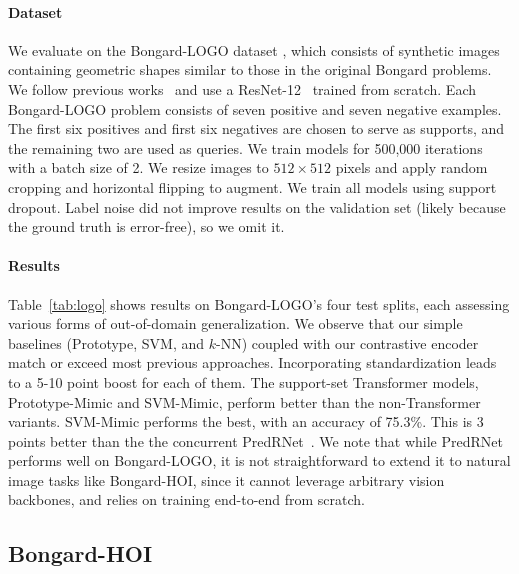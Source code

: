 \paragraph{Dataset}
We evaluate on the Bongard-LOGO dataset \cite{nie2021bongardlogo}, which consists of synthetic images containing geometric shapes similar to those in the original Bongard problems.
We follow previous works~\cite{nie2021bongardlogo} and use a ResNet-12~\cite{he2016deep} trained from scratch. Each Bongard-LOGO problem consists of seven positive and seven negative examples. The first six positives and first six negatives are chosen to serve as supports, and the remaining two are used as queries.
We train models for 500,000 iterations with a batch size of 2. We resize images to $512\times 512$ pixels and apply random cropping and horizontal flipping to augment. We train all models using support dropout. Label noise did not improve results on the validation set (likely because the ground truth is error-free), so we omit it.

\paragraph{Results} Table~\ref{tab:logo} shows results on Bongard-LOGO's four test splits, each assessing various forms of out-of-domain generalization. We observe that our simple baselines (Prototype, SVM, and $k$-NN) coupled with our contrastive encoder match or exceed most previous approaches. Incorporating standardization leads to a 5-10 point boost for each of them. The support-set Transformer models, Prototype-Mimic and SVM-Mimic, perform better than the non-Transformer variants.
SVM-Mimic performs the best, with an accuracy of 75.3\%. This is 3 points better than the the concurrent PredRNet~\cite{yang2023neural}.
We note that while PredRNet performs well on Bongard-LOGO, it is not straightforward to extend it to natural image tasks like Bongard-HOI, since it cannot leverage arbitrary vision backbones, and relies on training end-to-end from scratch.

\subsection{Bongard-HOI}
